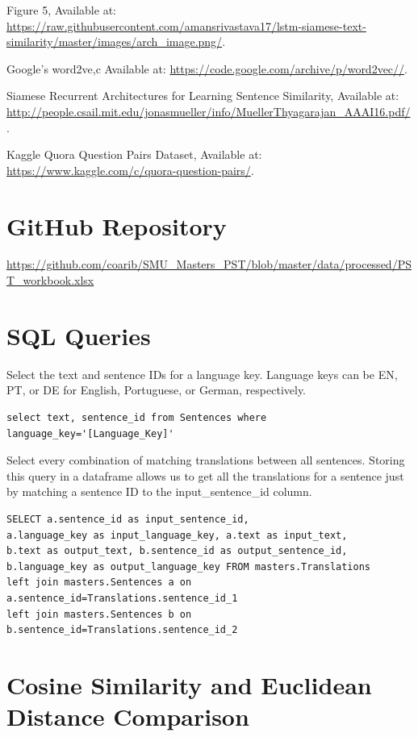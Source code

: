 \documentclass[runningheads]{llncs}
\begin{document}
\begin{thebibliography}{8}
Figure 5, Available at: \url{https://raw.githubusercontent.com/amansrivastava17/lstm-siamese-text-similarity/master/images/arch_image.png/}.

Google's word2ve,c Available at:
\url{https://code.google.com/archive/p/word2vec//}.

Siamese Recurrent Architectures for Learning Sentence Similarity, Available at:
\url{http://people.csail.mit.edu/jonasmueller/info/MuellerThyagarajan_AAAI16.pdf/}.

Kaggle Quora Question Pairs  Dataset, Available at: 
\url{https://www.kaggle.com/c/quora-question-pairs/}.


\end{thebibliography}


\appendix

\section{GitHub Repository}
	\url{https://github.com/coarib/SMU_Masters_PST/blob/master/data/processed/PST_workbook.xlsx}

\section{SQL Queries}
Select the text and sentence IDs for a language key. Language keys can be EN, PT, or DE for English, Portuguese, or German, respectively. 

\begin{verbatim}
select text, sentence_id from Sentences where language_key='[Language_Key]'
\end{verbatim}
Select every combination of matching translations between all sentences. Storing this query in a dataframe allows us to get all the translations for a sentence just by matching a sentence ID to the input\_sentence\_id column.

\begin{verbatim}
SELECT a.sentence_id as input_sentence_id, 
a.language_key as input_language_key, a.text as input_text, 
b.text as output_text, b.sentence_id as output_sentence_id, 
b.language_key as output_language_key FROM masters.Translations 
left join masters.Sentences a on a.sentence_id=Translations.sentence_id_1 
left join masters.Sentences b on b.sentence_id=Translations.sentence_id_2
\end{verbatim}

\section{Cosine Similarity and Euclidean Distance Comparison}
\hypertarget{Appendix C}{}
\end{document}
